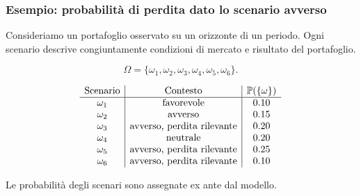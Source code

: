 \documentclass[handout]{beamer}%
\providecommand{\Prob}{\mathbb{P}}
\providecommand{\1}{\mathbf{1}}
\providecommand{\QTR}[2]{\csname #1\endcsname{#2}}
\begin{document}
\begin{frame}%
%

\frametitle{Esempio: probabilit\`{a} di perdita dato lo scenario avverso}%


Consideriamo un portafoglio osservato su un orizzonte di un periodo. Ogni
scenario descrive congiuntamente condizioni di mercato e risultato del portafoglio.%

\[
\Omega=\{\omega_{1},\omega_{2},\omega_{3},\omega_{4},\omega_{5},\omega_{6}\}.
\]
%

\[%
\begin{array}
[c]{c|c|c}%
\text{Scenario} & \text{Contesto} & \Prob(\{\omega\})\\\hline
\omega_{1} & \text{favorevole} & 0.10\\
\omega_{2} & \text{avverso} & 0.15\\
\omega_{3} & \text{avverso, perdita rilevante} & 0.20\\
\omega_{4} & \text{neutrale} & 0.20\\
\omega_{5} & \text{avverso, perdita rilevante} & 0.25\\
\omega_{6} & \text{avverso, perdita rilevante} & 0.10
\end{array}
\]


\medskip

Le probabilit\`{a} degli scenari sono assegnate ex ante dal modello.%

\transboxout
\end{frame}%


%
\end{document}
